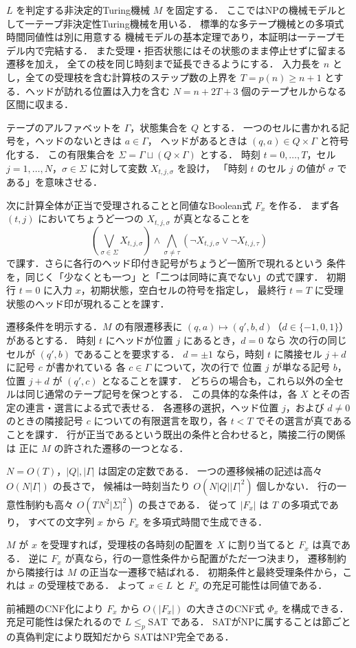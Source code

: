 \documentclass[a5paper,10pt,onecolumn]{jsarticle}
\makeatletter
\theoremstyle{mathnotetheorem}
\renewcommand{\proofname}{証明}
\renewenvironment{proof}[1][\proofname]{%
  \par\pushQED{\qed}\normalfont\topsep4\p@\@plus2\p@\relax
  \trivlist\item[\hskip\labelsep\bfseries #1]\ignorespaces
}{\popQED\endtrivlist\@endpefalse}
\makeatother
\begin{document}
\begin{proof}
$L$ を判定する非決定的Turing機械 $M$ を固定する．
ここではNPの機械モデルとして一テープ非決定性Turing機械を用いる．
標準的な多テープ機械との多項式時間同値性は別に用意する
機械モデルの基本定理であり，本証明は一テープモデル内で完結する．
また受理・拒否状態にはその状態のまま停止せずに留まる遷移を加え，
全ての枝を同じ時刻まで延長できるようにする．
入力長を $n$ とし，全ての受理枝を含む計算枝のステップ数の上界を
$T=p(n)\ge n+1$ とする．ヘッドが訪れる位置は入力を含む
$N=n+2T+3$ 個のテープセルからなる区間に収まる．

テープのアルファベットを $\Gamma$，状態集合を $Q$ とする．
一つのセルに書かれる記号を，ヘッドのないときは $a\in\Gamma$，
ヘッドがあるときは $(q,a)\in Q\times\Gamma$ と符号化する．
この有限集合を $\Sigma=\Gamma\sqcup(Q\times\Gamma)$ とする．
時刻 $t=0,\ldots,T$，セル $j=1,\ldots,N$，$\sigma\in\Sigma$
に対して変数 $X_{t,j,\sigma}$ を設け，
「時刻 $t$ のセル $j$ の値が $\sigma$ である」を意味させる．

次に計算全体が正当で受理されることと同値なBoolean式 $F_x$ を作る．
まず各 $(t,j)$ においてちょうど一つの $X_{t,j,\sigma}$ が真となることを
\[
 \left(\bigvee_{\sigma\in\Sigma}X_{t,j,\sigma}\right)
 \wedge\bigwedge_{\sigma\ne\tau}
 (\neg X_{t,j,\sigma}\vee\neg X_{t,j,\tau})
\]
で課す．さらに各行のヘッド印付き記号がちょうど一箇所で現れるという
条件を，同じく「少なくとも一つ」と「二つは同時に真でない」の式で課す．
初期行 $t=0$ に入力 $x$，初期状態，空白セルの符号を指定し，
最終行 $t=T$ に受理状態のヘッド印が現れることを課す．

遷移条件を明示する．$M$ の有限遷移表に
$(q,a)\mapsto(q',b,d)$（$d\in\{-1,0,1\}$）があるとする．
時刻 $t$ にヘッドが位置 $j$ にあるとき，$d=0$ なら
次の行の同じセルが $(q',b)$ であることを要求する．
$d=\pm1$ なら，時刻 $t$ に隣接セル $j+d$ に記号 $c$ が書かれている
各 $c\in\Gamma$ について，次の行で
位置 $j$ が単なる記号 $b$，位置 $j+d$ が $(q',c)$ となることを課す．
どちらの場合も，これら以外の全セルは同じ通常のテープ記号を保つとする．
この具体的な条件は，各 $X$ とその否定の連言・選言による式で表せる．
各遷移の選択，ヘッド位置 $j$，および $d\ne0$ のときの隣接記号 $c$
についての有限選言を取り，各 $t<T$ でその選言が真であることを課す．
行が正当であるという既出の条件と合わせると，隣接二行の関係は
正に $M$ の許された遷移の一つとなる．

$N=O(T)$，$|Q|,|\Gamma|$ は固定の定数である．
一つの遷移候補の記述は高々 $O(N|\Gamma|)$ の長さで，
候補は一時刻当たり $O(N|Q||\Gamma|^2)$ 個しかない．
行の一意性制約も高々 $O(TN^2|\Sigma|^2)$ の長さである．
従って $|F_x|$ は $T$ の多項式であり，
すべての文字列 $x$ から $F_x$ を多項式時間で生成できる．

$M$ が $x$ を受理すれば，受理枝の各時刻の配置を
$X$ に割り当てると $F_x$ は真である．
逆に $F_x$ が真なら，行の一意性条件から配置がただ一つ決まり，
遷移制約から隣接行は $M$ の正当な一遷移で結ばれる．
初期条件と最終受理条件から，これは $x$ の受理枝である．
よって $x\in L$ と $F_x$ の充足可能性は同値である．

前補題のCNF化により $F_x$ から $O(|F_x|)$ の大きさのCNF式
$\Phi_x$ を構成できる．充足可能性は保たれるので
$L\le_p\mathrm{SAT}$ である．
SATがNPに属することは節ごとの真偽判定により既知だから
SATはNP完全である．
\end{proof}
\end{document}

